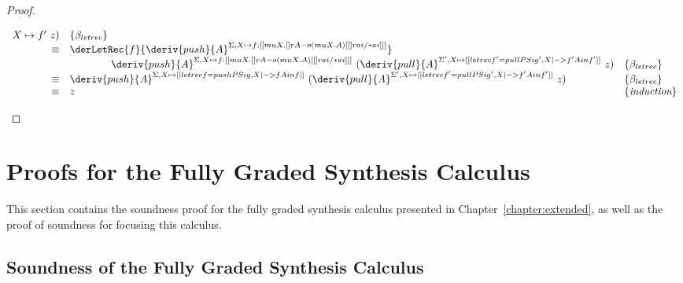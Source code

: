 \begin{proof}
\begin{itemize}
\begin{align*}
\begin{array}{rll}
{{{{                                 X \mapsto f' }}\ z)}} &\{\beta_{letrec} \} \\
  \equiv & \derLetRec{f}{\deriv{push}{A}^{\Sigma, X \mapsto
           f : [[ {mu X . {[] r A}} -o {{(mu X . A)} [ [] r ai /* ai ]} ]] }}\\ & \qquad \qquad {{\deriv{push}{A}^{\Sigma, X \mapsto
           f : [[ {mu X . {[] r A}} -o {{(mu X . A)} [ [] r ai /* ai ]} ]] }\ ({\deriv{pull}{A}^{\Sigma',
                                 X \mapsto [[ letrec f' = pullP {Sig', X |-> f'} A in f']] }}\ z)}} &\{\beta_{letrec} \} \\
  \equiv & {\deriv{push}{A}^{\Sigma, X \mapsto {[[ letrec f = pushP {Sig, X |-> f} A in f ]] }}\ ({\deriv{pull}{A}^{\Sigma',
                                 X \mapsto [[ letrec f' = pullP {Sig', X |-> f'} A in f' ]]}}\ z)} &\{\beta_{letrec} \} \\
\equiv & z & \{\textit{induction}\}
  \end{array}
\end{align*}
\end{itemize}
\end{proof}



\section{Proofs for the Fully Graded Synthesis Calculus}
This section contains the soundness proof for the fully graded 
synthesis calculus presented in Chapter~\ref{chapter:extended}, as well 
as the proof of soundness for focusing this calculus.

\subsection{Soundness of the Fully Graded Synthesis Calculus}
\label{proofs:graded-base-soundness}

